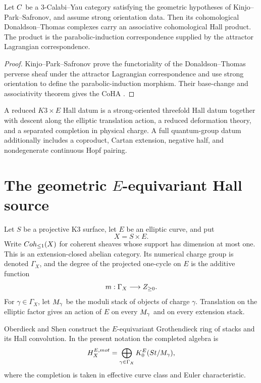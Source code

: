 \begin{theorem}
Let $C$ be a $3$-Calabi--Yau category satisfying the geometric hypotheses of Kinjo--Park--Safronov, and assume strong orientation data.  Then its cohomological Donaldson--Thomas complexes carry an associative cohomological Hall product.  The product is the parabolic-induction correspondence supplied by the attractor Lagrangian correspondence.
\end{theorem}
\begin{proof}
Kinjo--Park--Safronov prove the functoriality of the Donaldson--Thomas perverse sheaf under the attractor Lagrangian correspondence and use strong orientation to define the parabolic-induction morphism.  Their base-change and associativity theorem gives the CoHA \cite{KPS}.
\end{proof}

\begin{definition}
A reduced $K3\times E$ Hall datum is a strong-oriented threefold Hall datum together with descent along the elliptic translation action, a reduced deformation theory, and a separated completion in physical charge.  A full quantum-group datum additionally includes a coproduct, Cartan extension, negative half, and nondegenerate continuous Hopf pairing.
\end{definition}

\chapter{The geometric \texorpdfstring{$E$}{E}-equivariant Hall source}
Let $S$ be a projective K3 surface, let $E$ be an elliptic curve, and put
\[
 X=S\times E.
\]
Write $Coh_{\leq1}(X)$ for coherent sheaves whose support has dimension at most one.  This is an extension-closed abelian category.  Its numerical charge group is denoted $\Gamma_X$, and the degree of the projected one-cycle on $E$ is the additive function
\[
 m:\Gamma_X\longrightarrow Z_{\geq0}.
\]
For $\gamma\in\Gamma_X$, let $M_\gamma$ be the moduli stack of objects of charge $\gamma$.  Translation on the elliptic factor gives an action of $E$ on every $M_\gamma$ and on every extension stack.

Oberdieck and Shen construct the $E$-equivariant Grothendieck ring of stacks and its Hall convolution.  In the present notation the completed algebra is
\[
 H_X^{E,mot}
 =\bigoplus_{\gamma\in\Gamma_X}
 K_0^E(St/M_\gamma),
\]
where the completion is taken in effective curve class and Euler characteristic.


